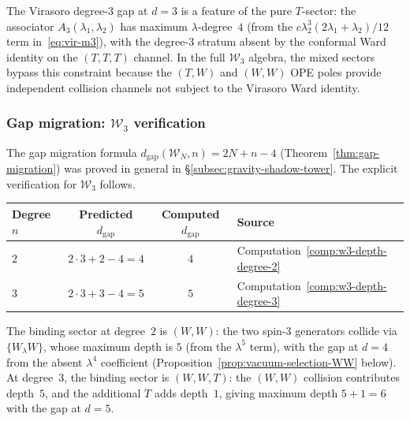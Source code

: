 \begin{remark}%
\label{rem:sector-gap-filling}%
%
The Virasoro degree-$3$ gap at $d = 3$ is a feature of the
pure $T$-sector: the associator $A_3(\lambda_1, \lambda_2)$
has maximum $\lambda$-degree~$4$ (from the $c\lambda_2^3
(2\lambda_1 + \lambda_2)/12$ term in~\eqref{eq:vir-m3}),
with the degree-$3$ stratum absent by the conformal Ward
identity on the $(T,T,T)$ channel. In the full $\mathcal{W}_3$
algebra, the mixed sectors bypass this constraint because
the $(T,W)$ and $(W,W)$ OPE poles provide independent
collision channels not subject to the Virasoro Ward identity.
\end{remark}


\subsubsection{Gap migration: $\mathcal{W}_3$ verification}
\label{subsubsec:w3-gap-migration}

The gap migration formula $d_{\mathrm{gap}}(\mathcal{W}_N, n)
= 2N + n - 4$ (Theorem~\ref{thm:gap-migration}) was proved
in general in \S\ref{subsec:gravity-shadow-tower}. The explicit verification for $\mathcal{W}_3$ follows.

\begin{computation}
\label{comp:w3-gap-migration-verification}
%
\begin{center}
\small
\renewcommand{\arraystretch}{1.3}
\begin{tabular}{lccl}
\toprule
\textbf{Degree $n$} & \textbf{Predicted
 $d_{\mathrm{gap}}$} & \textbf{Computed
 $d_{\mathrm{gap}}$} & \textbf{Source} \\
\midrule
$2$ & $2 \cdot 3 + 2 - 4 = 4$ & $4$
 & Computation~\ref{comp:w3-depth-degree-2} \\
$3$ & $2 \cdot 3 + 3 - 4 = 5$ & $5$
 & Computation~\ref{comp:w3-depth-degree-3} \\
\bottomrule
\end{tabular}
\end{center}

\noindent
The binding sector at degree~$2$ is $(W, W)$: the two
spin-$3$ generators collide via $\{W_\lambda W\}$, whose
maximum depth is $5$ (from the $\lambda^5$ term), with the
gap at $d = 4$ from the absent $\lambda^4$ coefficient
(Proposition~\ref{prop:vacuum-selection-WW} below).
At degree~$3$, the binding sector is $(W, W, T)$: the
$(W,W)$ collision contributes depth~$5$, and the
additional $T$ adds depth~$1$, giving maximum depth
$5 + 1 = 6$ with the gap at $d = 5$.
\end{computation}

